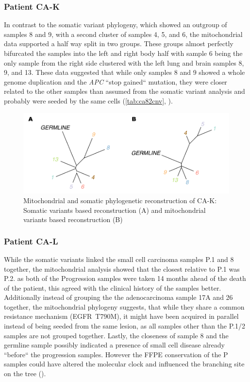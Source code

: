 \subsubsection{Patient CA-K}

In contrast to the somatic variant phylogeny, which showed an outgroup of samples 8 and 9, with a second cluster of samples 4, 5, and 6, the mitochondrial data supported a half way split in two groups. These groups almost perfectly bifurcated the samples into the left and right body half with sample 6 being the only sample from  the right side clustered with the left lung and brain samples 8, 9, and 13. These data suggested that while only samples 8 and 9 showed a whole genome duplication and the \textit{APC} ``stop gained`` mutation, they were closer related to the other samples than assumed from the somatic variant analysis and probably were seeded by the same cells (\autoref{tab:ca82cnv}, ).

\begin{figure}[ht]
\centering
\includegraphics[width=.99\linewidth]{Figures/CASCADE/mito/CA82SomVsMitoPhylo.pdf}
\caption[Mitochondrial and somatic phylogenetic reconstruction of CA-K]{Mitochondrial and somatic phylogenetic reconstruction of CA-K: Somatic variants based reconstruction (A) and mitochondrial variants based reconstruction (B)} \label{fig:CA82mitoPhylo}
\end{figure}


\subsubsection{Patient CA-L}
While the somatic variants linked the small cell carcinoma samples P.1 and 8 together, the mitochondrial analysis showed that the closest relative to P.1 was P.2. as both of the Progression samples were taken 14 months ahead of the death of the patient, this agreed with the clinical history of the samples better. Additionally instead of grouping the the adenocarcinoma sample 17A and 26 together, the mitochondrial phylogeny suggests, that while they share a common resistance mechanism (EGFR~T790M), it might have been acquired in parallel instead of being seeded from the same lesion, as all samples other than the P.1/2 samples are not grouped together. Lastly, the closeness of sample 8 and the germline sample possibly indicated a presence of small cell disease already ``before`` the progression samples. However the FFPE conservation of the P samples could have altered the molecular clock and influenced the branching site on the tree ().

